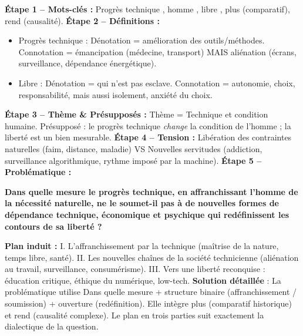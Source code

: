\documentclass[11pt]{article}
\begin{document}
\begin{exoresolu}
\textbf{Étape 1 -- Mots-clés :} \og Progrès technique \fg{}, \og homme \fg{}, \og libre \fg{}, \og plus \fg{} (comparatif), \og rend \fg{} (causalité).
\textbf{Étape 2 -- Définitions :}
\begin{itemize}
    \item \og Progrès technique \fg{} : Dénotation = amélioration des outils/méthodes. Connotation = émancipation (médecine, transport) MAIS aliénation (écrans, surveillance, dépendance énergétique).
    \item \og Libre \fg{} : Dénotation = qui n'est pas esclave. Connotation = autonomie, choix, responsabilité, mais aussi isolement, anxiété du choix.
\end{itemize}
\textbf{Étape 3 -- Thème \& Présupposés :} Thème = Technique et condition humaine. Présupposé : le progrès technique \emph{change} la condition de l'homme ; la liberté est un bien mesurable.
\textbf{Étape 4 -- Tension :} Libération des contraintes naturelles (faim, distance, maladie) VS Nouvelles servitudes (addiction, surveillance algorithmique, rythme imposé par la machine).
\textbf{Étape 5 -- Problématique :}
\begin{center}
\og \textbf{Dans quelle mesure le progrès technique, en affranchissant l'homme de la nécessité naturelle, ne le soumet-il pas à de nouvelles formes de dépendance technique, économique et psychique qui redéfinissent les contours de sa liberté ?} \fg{}
\end{center}
\textbf{Plan induit :}
I. L'affranchissement par la technique (maîtrise de la nature, temps libre, santé).
II. Les nouvelles chaînes de la société technicienne (aliénation au travail, surveillance, consumérisme).
III. Vers une liberté reconquise : éducation critique, éthique du numérique, low-tech.
\tcblower
\textbf{Solution détaillée} : La problématique utilise \og Dans quelle mesure \fg{} + structure binaire (affranchissement / soumission) + ouverture (redéfinition). Elle intègre \og plus \fg{} (comparatif historique) et \og rend \fg{} (causalité complexe). Le plan en trois parties suit exactement la dialectique de la question.
\end{exoresolu}
\end{document}
